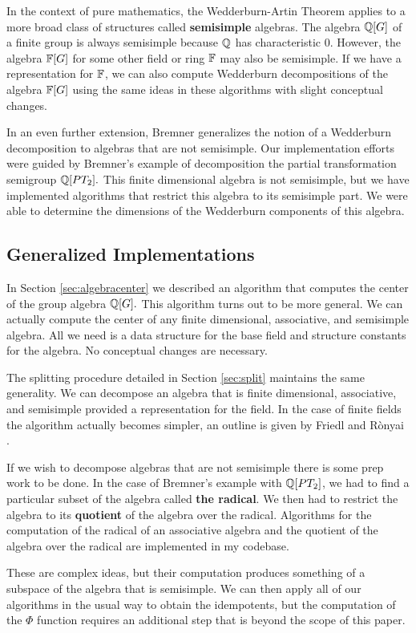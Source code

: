 \documentclass[../thesis.tex]{subfiles}
\begin{document}
In the context of pure mathematics, the Wedderburn-Artin Theorem applies to a more broad class of structures called \textbf{semisimple} algebras. The algebra $\mathbb{Q}[G]$ of a finite group is always semisimple because $\mathbb{Q}$ has characteristic 0. However, the algebra $\mathbb{F}[G]$ for some other field or ring $\mathbb{F}$ may also be semisimple. If we have a representation for $\mathbb{F}$, we can also compute Wedderburn decompositions of the algebra $\mathbb{F}[G]$ using the same ideas in these algorithms with slight conceptual changes.

In an even further extension, Bremner \cite{bremner} generalizes the notion of a Wedderburn decomposition to algebras that are not semisimple. Our implementation efforts were guided by Bremner's example of decomposition the partial transformation semigroup $\mathbb{Q}[PT_2].$ This finite dimensional algebra is not semisimple, but we have implemented algorithms that restrict this algebra to its semisimple part. We were able to determine the dimensions of the Wedderburn components of this algebra.

\subsection{Generalized Implementations}
In Section \ref{sec:algebracenter} we described an algorithm that computes the center of the group algebra $\mathbb{Q}[G].$ This algorithm turns out to be more general. We can actually compute the center of any finite dimensional, associative, and semisimple algebra. All we need is a data structure for the base field and structure constants for the algebra. No conceptual changes are necessary.

The splitting procedure detailed in Section \ref{sec:split} maintains the same generality. We can decompose an algebra that is finite dimensional, associative, and semisimple provided a representation for the field. In the case of finite fields the algorithm actually becomes simpler, an outline is given by Friedl and R\`onyai \cite{PolyTimeSolns}.

If we wish to decompose algebras that are not semisimple there is some prep work to be done. In the case of Bremner's example with $\mathbb{Q}[PT_2]$, we had to find a particular subset of the algebra called \textbf{the radical}. We then had to restrict the algebra to its \textbf{quotient} of the algebra over the radical. Algorithms for the computation of the radical of an associative algebra and the quotient of the algebra over the radical are implemented in my codebase.

These are complex ideas, but their computation produces something of a subspace of the algebra that is semisimple. We can then apply all of our algorithms in the usual way to obtain the idempotents, but the computation of the $\Phi$ function requires an additional step that is beyond the scope of this paper.
\end{document}
